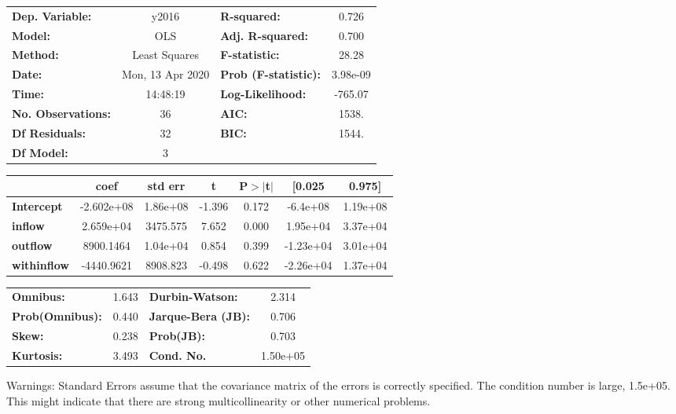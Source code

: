 \begin{center}
\begin{tabular}{lclc}
\toprule
\textbf{Dep. Variable:}    &      y2016       & \textbf{  R-squared:         } &     0.726   \\
\textbf{Model:}            &       OLS        & \textbf{  Adj. R-squared:    } &     0.700   \\
\textbf{Method:}           &  Least Squares   & \textbf{  F-statistic:       } &     28.28   \\
\textbf{Date:}             & Mon, 13 Apr 2020 & \textbf{  Prob (F-statistic):} &  3.98e-09   \\
\textbf{Time:}             &     14:48:19     & \textbf{  Log-Likelihood:    } &   -765.07   \\
\textbf{No. Observations:} &          36      & \textbf{  AIC:               } &     1538.   \\
\textbf{Df Residuals:}     &          32      & \textbf{  BIC:               } &     1544.   \\
\textbf{Df Model:}         &           3      & \textbf{                     } &             \\
\bottomrule
\end{tabular}
\begin{tabular}{lcccccc}
                    & \textbf{coef} & \textbf{std err} & \textbf{t} & \textbf{P$> |$t$|$} & \textbf{[0.025} & \textbf{0.975]}  \\
\midrule
\textbf{Intercept}  &   -2.602e+08  &     1.86e+08     &    -1.396  &         0.172        &     -6.4e+08    &     1.19e+08     \\
\textbf{inflow}     &    2.659e+04  &     3475.575     &     7.652  &         0.000        &     1.95e+04    &     3.37e+04     \\
\textbf{outflow}    &    8900.1464  &     1.04e+04     &     0.854  &         0.399        &    -1.23e+04    &     3.01e+04     \\
\textbf{withinflow} &   -4440.9621  &     8908.823     &    -0.498  &         0.622        &    -2.26e+04    &     1.37e+04     \\
\bottomrule
\end{tabular}
\begin{tabular}{lclc}
\textbf{Omnibus:}       &  1.643 & \textbf{  Durbin-Watson:     } &    2.314  \\
\textbf{Prob(Omnibus):} &  0.440 & \textbf{  Jarque-Bera (JB):  } &    0.706  \\
\textbf{Skew:}          &  0.238 & \textbf{  Prob(JB):          } &    0.703  \\
\textbf{Kurtosis:}      &  3.493 & \textbf{  Cond. No.          } & 1.50e+05  \\
\bottomrule
\end{tabular}
\end{center}

Warnings: \newline
 [1] Standard Errors assume that the covariance matrix of the errors is correctly specified. \newline
 [2] The condition number is large, 1.5e+05. This might indicate that there are \newline
 strong multicollinearity or other numerical problems.